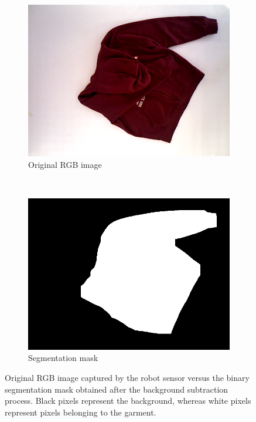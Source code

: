 \begin{figure}[htbp]
	\centering
    \begin{subfigure}[l]{0.49\textwidth}
	    \centering
    	\includegraphics[width=\textwidth]
    	{figures/segmentation_original.png}
    	\caption{Original RGB image}
	\end{subfigure}
	~
    \begin{subfigure}[r]{0.49\textwidth}
	    \centering
    	\includegraphics[width=\textwidth]
    	{figures/segmentation_mask.png}
    	\caption{Segmentation mask}
	\end{subfigure} 
    \caption{Original RGB image captured by the robot sensor versus the binary segmentation mask obtained after the background subtraction process. Black pixels represent the background, whereas white pixels represent pixels belonging to the garment.}
    \label{fig:segmentation_mask}
\end{figure}



